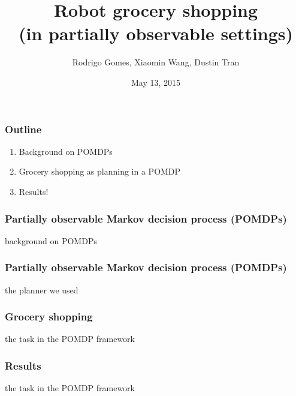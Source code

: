 \documentclass[10pt, compress]{beamer}
\title{Robot grocery shopping\\(in partially observable settings)}
\subtitle{}
\date{May 13, 2015}
\author{Rodrigo Gomes, Xiaomin Wang, Dustin Tran}
\institute{MIT, 6.834j Cognitive Robotics}
\begin{document}
\maketitle

\begin{frame}[fragile]
  \frametitle{Outline}

  \begin{enumerate}
  \item Background on POMDPs
  \item Grocery shopping as planning in a POMDP
  \item Results!
  \end{enumerate}
\end{frame}

\begin{frame}[fragile]
  \frametitle{Partially observable Markov decision process (POMDPs)}

  background on POMDPs
\end{frame}

\begin{frame}[fragile]
  \frametitle{Partially observable Markov decision process (POMDPs)}

  the planner we used
\end{frame}

\begin{frame}[fragile]
  \frametitle{Grocery shopping}

  the task in the POMDP framework
\end{frame}

\begin{frame}[fragile]
  \frametitle{Results}

  the task in the POMDP framework
\end{frame}

\end{document}
